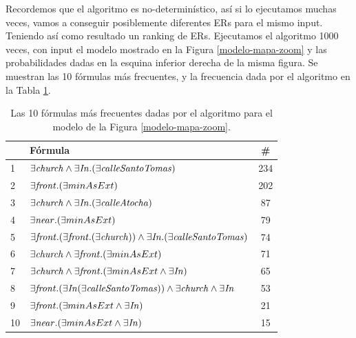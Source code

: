 Recordemos que el algoritmo es no-determin\'istico, as\'i si lo ejecutamos muchas veces, vamos a conseguir posiblemente diferentes ERs para el mismo input. Teniendo as\'i como resultado un ranking de ERs.
Ejecutamos el algoritmo 1000 veces, con input el modelo mostrado en la Figura \ref{modelo-mapa-zoom} y las probabilidades dadas en la esquina inferior derecha de la misma figura. Se muestran las 10 f\'ormulas m\'as frecuentes, y la frecuencia dada por el algoritmo en la Tabla \ref{formulas-mapa-zoom}. 

\begin{table}[H]
\begin{center}
\begin{tabular}{|l|l|c|}
\hline
&F\'ormula			      &  \# \\ \hline \hline

1 & $\exists \mathit{church} \land \exists \mathit{In} .(\exists \mathit{calleSantoTomas}) $&234 \\ \hline

2 & $\exists \mathit{front} . (\exists minAsExt)$&202 \\ \hline

3& $\exists \mathit{church} \land \exists \mathit{In} .(\exists \mathit{calleAtocha})$&87 \\ \hline

4& $\exists \mathit{near} .(\exists minAsExt)$&79 \\ \hline

5& $\exists \mathit{front} .(\exists \mathit{front} .(\exists \mathit{church})) \land \exists \mathit{In} .(\exists \mathit{calleSantoTomas})$&74 \\ \hline

6& $\exists \mathit{church} \land \exists \mathit{front} .(\exists minAsExt)$&71 \\ \hline

7& $\exists \mathit{church} \land \exists \mathit{front} .(\exists minAsExt \land \exists \mathit{In})$&65 \\ \hline

8& $\exists \mathit{front} .(\exists \mathit{In} (\exists \mathit{calleSantoTomas})) \land \exists \mathit{church} \land \exists \mathit{In}$&53 \\ \hline

9& $\exists \mathit{front} .(\exists minAsExt \land \exists \mathit{In} )$&21 \\ \hline

10&$\exists \mathit{near} .(\exists minAsExt \land \exists \mathit{In} )$&15 \\

\hline
\end{tabular}

\caption{Las 10 f\'ormulas m\'as frecuentes dadas por el algoritmo para el modelo de la Figura \protect\ref{modelo-mapa-zoom}.}\label{formulas-mapa-zoom}
\end{center}
\end{table}

